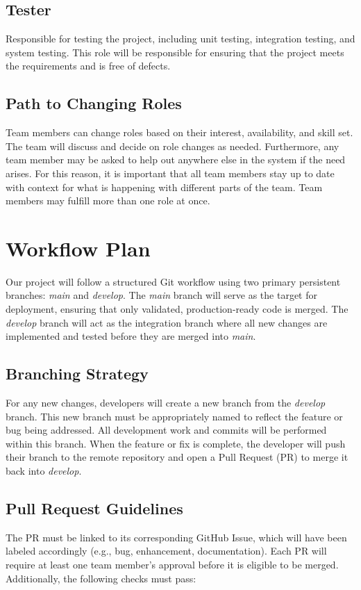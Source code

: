 \documentclass{article}
\begin{document}
\subsection*{Tester} Responsible for testing the project, including unit testing, integration testing, and system testing. This role will be responsible for ensuring that the project meets the requirements and is free of defects.
\subsection*{Path to Changing Roles} Team members can change roles based on their interest, availability, and skill set. The team will discuss and decide on role changes as needed. Furthermore, any team member may be asked to help out anywhere else in the system if the need arises. For this reason, it is important that all team members stay up to date with context for what is happening with different parts of the team. Team members may fulfill more than one role at once.

\section{Workflow Plan}
Our project will follow a structured Git workflow using two primary persistent branches: \textit{main} and \textit{develop}. The \textit{main} branch will serve as the target for deployment, ensuring that only validated, production-ready code is merged. The \textit{develop} branch will act as the integration branch where all new changes are implemented and tested before they are merged into \textit{main}.

\subsection*{Branching Strategy}
For any new changes, developers will create a new branch from the \textit{develop} branch. This new branch must be appropriately named to reflect the feature or bug being addressed. All development work and commits will be performed within this branch. When the feature or fix is complete, the developer will push their branch to the remote repository and open a Pull Request (PR) to merge it back into \textit{develop}.

\subsection*{Pull Request Guidelines}
The PR must be linked to its corresponding GitHub Issue, which will have been labeled accordingly (e.g., bug, enhancement, documentation). Each PR will require at least one team member's approval before it is eligible to be merged. Additionally, the following checks must pass:
\end{document}
